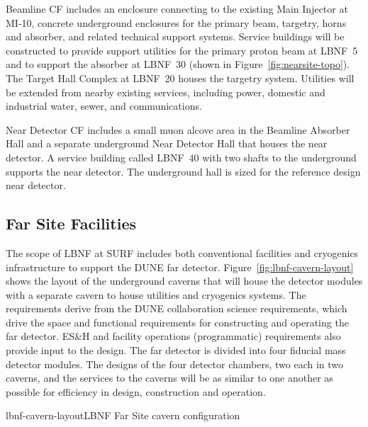 Beamline CF includes an enclosure connecting to the existing Main Injector at MI-10, concrete underground enclosures for the primary beam, targetry, horns and absorber, and related technical support systems. Service buildings will be constructed to provide support utilities for the primary proton beam at LBNF~5 and to support the absorber at LBNF~30 (shown in Figure~\ref{fig:nearsite-topo}).  The Target Hall Complex at LBNF~20 houses the targetry system.  Utilities will be extended from nearby existing services, including power, domestic and industrial water, sewer, and communications. 
 
Near Detector CF includes a small muon alcove area in the Beamline Absorber Hall and a separate underground Near Detector Hall that houses the near detector. A service building called LBNF~40 with two shafts to the underground supports the near detector. The underground hall is sized for the reference design near detector.
 
\subsection{Far Site Facilities}
 
The scope of LBNF at SURF includes both conventional facilities and cryogenics infrastructure to support the DUNE far detector. Figure~\ref{fig:lbnf-cavern-layout} shows the layout of the underground caverns that will house the detector modules with a separate cavern to house utilities and cryogenics systems. The requirements derive from the DUNE collaboration science requirements, which drive the space and functional requirements for constructing and operating the far detector.  ES\&H and facility operations (programmatic) requirements also provide input to the design. The far detector is divided into four  fiducial mass detector modules. The designs of the four detector chambers, two each in two caverns, and the services to the caverns will be as similar to one another as possible for efficiency in design, construction and operation. 
 
\begin{dunefigure}{lbnf-cavern-layout}{LBNF Far Site cavern configuration}  
\end{dunefigure}
 
